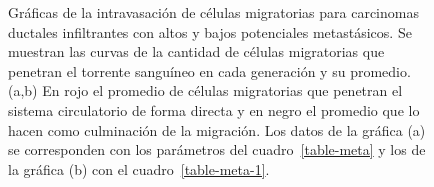 \begin{figure}[!ht]
\begin{center}
\vspace*{-0.2cm}
\end{center}\vspace*{-0.6cm}
\caption[Gr\'aficas de la intravasaci\'on de c\'elulas migratorias]{Gr\'aficas de la intravasaci\'on de c\'elulas migratorias para carcinomas ductales infiltrantes con altos y bajos potenciales metast\'asicos. Se muestran las curvas de la cantidad de c\'elulas migratorias que penetran el torrente sangu\'ineo en cada generaci\'on y su promedio. (a,b) En rojo el promedio de c\'elulas migratorias que penetran el sistema circulatorio de forma directa y en negro el promedio que lo hacen como culminaci\'on de la migraci\'on. Los datos de la gr\'afica (a) se corresponden con los par\'ametros del cuadro~\ref{table-meta} y los de la gr\'afica (b) con el cuadro~\ref{table-meta-1}.}
\label{graph-intravasation}
\end{figure}

